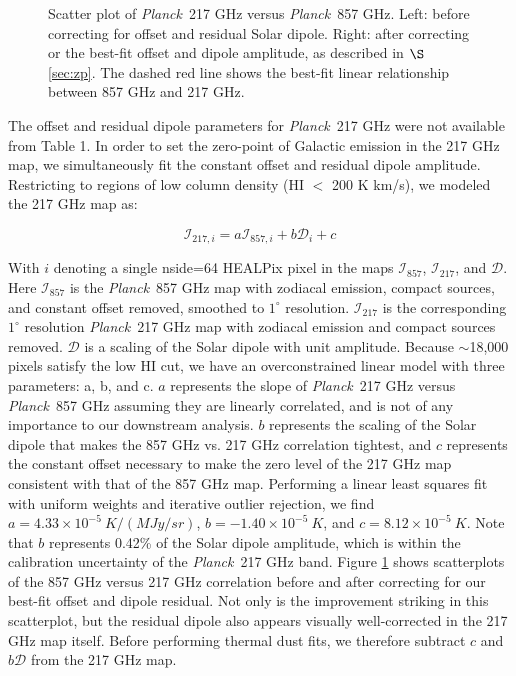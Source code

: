 \documentclass{emulateapj}
\newcommand{\PLANCK}{{\it Planck}}
\begin{document}
\begin{figure}
\begin{center}
\caption{\label{fig:scatter} Scatter plot of \PLANCK~217 GHz versus \PLANCK~857
GHz. Left: before correcting for offset and residual Solar dipole. Right: after
correcting or the best-fit offset and dipole amplitude, as described in 
$\S$\ref{sec:zp}. The dashed red line shows the best-fit linear relationship
between 857 GHz and 217 GHz.}
\end{center}
\end{figure}

The offset and residual dipole parameters for \PLANCK~217 GHz were not 
available from \cite{planckdust} Table 1. In order to set the zero-point of 
Galactic emission in the 217 GHz map, we simultaneously fit the constant 
offset and residual dipole amplitude. Restricting to regions of low column 
density (HI $<$ 200 K km/s), we modeled the 217 GHz map as:

\begin{equation}
\mathcal{I}_{217, i} = a\mathcal{I}_{857, i} + b\mathcal{D}_{i} + c
\end{equation}

With $i$ denoting a single nside=64 HEALPix pixel in the maps 
$\mathcal{I}_{857}$, $\mathcal{I}_{217}$, and $\mathcal{D}$. Here 
$\mathcal{I}_{857}$ is the \PLANCK~857 GHz map with zodiacal emission, compact 
sources, and constant offset removed, smoothed to $1^{\circ}$ resolution. 
$\mathcal{I}_{217}$ is the corresponding $1^{\circ}$ resolution \PLANCK~217 
GHz map with zodiacal emission and compact sources removed. $\mathcal{D}$ is a
scaling of the Solar dipole with unit amplitude. Because $\sim$18,000 pixels
satisfy the low HI cut, we have an overconstrained linear model with three
parameters: a, b, and c. $a$ represents the slope of \PLANCK~217 GHz 
versus \PLANCK~857 GHz assuming they are linearly correlated, and is not
of any importance to our downstream analysis. $b$ represents the scaling of 
the Solar dipole that makes the 857 GHz vs. 217 GHz correlation tightest, and 
$c$ represents the constant offset necessary to make the zero level of the 217 
GHz map consistent with that of the 857 GHz map. Performing a linear least
squares fit with uniform weights and iterative outlier rejection, we find 
$a=4.33\times10^{-5}\ K/(MJy/sr)$, $b=-1.40\times10^{-5}\ K$, and 
$c=8.12\times10^{-5}\ K$. Note that $b$ represents 0.42\% of the Solar dipole 
amplitude, which is within the calibration uncertainty of the \PLANCK~217 GHz 
band. Figure \ref{fig:scatter} shows scatterplots of the 857 GHz versus 217 
GHz correlation before and after correcting for our best-fit offset and dipole 
residual. Not only is the improvement striking in this scatterplot, but the 
residual dipole also appears visually well-corrected in the 217 GHz map 
itself. Before performing thermal dust fits, we therefore subtract $c$ and 
$b\mathcal{D}$ from the 217 GHz map.
\end{document}
